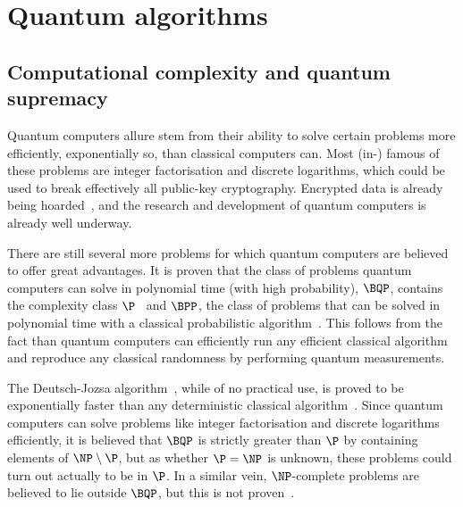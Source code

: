 \section{Quantum algorithms}
\subsection{Computational complexity and quantum supremacy}
Quantum computers allure stem from their ability to solve certain problems more efficiently, exponentially so, than classical computers can.
Most (in-) famous of these problems are integer factorisation and discrete logarithms, which could be used to break effectively all public-key cryptography.
Encrypted data is already being hoarded~\autocite{NEEDED}, and the research and development of quantum computers is already well underway.

There are still several more problems for which quantum computers are believed to offer great advantages.
It is proven that the class of problems quantum computers can solve in polynomial time (with high probability), $\BQP$, contains the complexity class $\P$~\autocite{nielsen2012} and $\BPP$, the class of problems that can be solved in polynomial time with a classical probabilistic algorithm~\autocite{nielsen2012}.
This follows from the fact than quantum computers can efficiently run any efficient classical algorithm and reproduce any classical randomness by performing quantum measurements.

The Deutsch-Jozsa algorithm~\autocite{deutsch1992}, while of no practical use, is proved to be exponentially faster than any deterministic classical algorithm\footnotemark~\autocite{NEEDED}.
Since quantum computers can solve problems like integer factorisation and discrete logarithms efficiently, it is believed that $\BQP$ is strictly greater than $\P$ by containing elements of $\NP \setminus \P$, but as whether $\P = \NP$ is unknown, these problems could turn out actually to be in $\P$.
In a similar vein, $\NP$-complete problems are believed to lie outside $\BQP$, but this is not proven~\autocite{NEEDED}.


